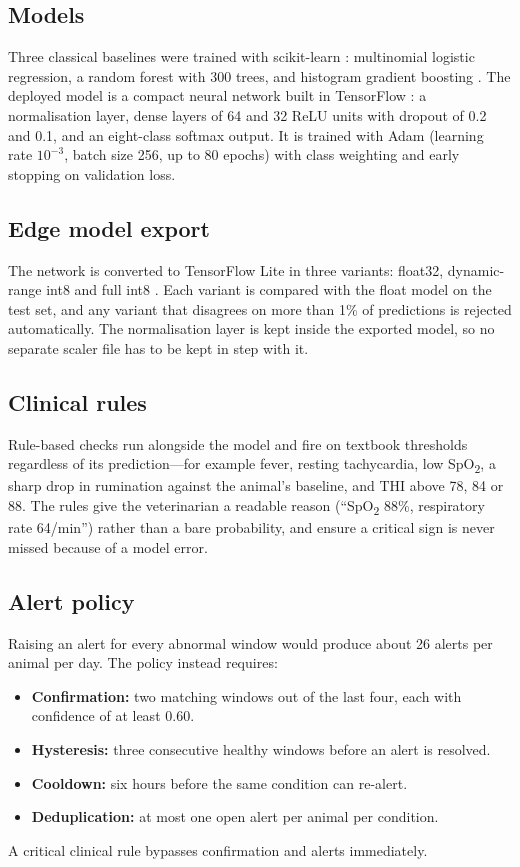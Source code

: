 \documentclass[conference]{IEEEtran}
\begin{document}
\subsection{Models}
Three classical baselines were trained with scikit-learn \cite{pedregosa2011}:
multinomial logistic regression, a random forest \cite{breiman2001} with 300
trees, and histogram gradient boosting \cite{friedman2001}. The deployed model
is a compact neural network built in TensorFlow \cite{abadi2016}: a
normalisation layer, dense layers of 64 and 32 ReLU units with dropout of 0.2
and 0.1, and an eight-class softmax output. It is trained with Adam
\cite{kingma2015} (learning rate $10^{-3}$, batch size 256, up to 80 epochs) with
class weighting and early stopping on validation loss.

\subsection{Edge model export}
The network is converted to TensorFlow Lite in three variants: float32,
dynamic-range int8 and full int8 \cite{jacob2018quant}. Each variant is compared
with the float model on the test set, and any variant that disagrees on more
than 1\% of predictions is rejected automatically. The normalisation layer is
kept inside the exported model, so no separate scaler file has to be kept in
step with it.

\subsection{Clinical rules}
Rule-based checks run alongside the model and fire on textbook thresholds
regardless of its prediction---for example fever, resting tachycardia, low
SpO\textsubscript{2}, a sharp drop in rumination against the animal's
baseline, and THI above 78, 84 or 88. The rules give the veterinarian a readable
reason (``SpO\textsubscript{2} 88\%, respiratory rate 64/min'') rather than a
bare probability, and ensure a critical sign is never missed because of a model
error.

\subsection{Alert policy}
Raising an alert for every abnormal window would produce about 26 alerts per
animal per day. The policy instead requires:
\begin{itemize}
\item \textbf{Confirmation:} two matching windows out of the last four, each with
confidence of at least 0.60.
\item \textbf{Hysteresis:} three consecutive healthy windows before an alert is
resolved.
\item \textbf{Cooldown:} six hours before the same condition can re-alert.
\item \textbf{Deduplication:} at most one open alert per animal per condition.
\end{itemize}
A critical clinical rule bypasses confirmation and alerts immediately.
\end{document}
